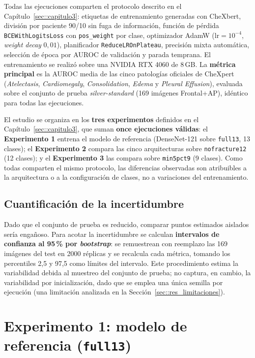 Todas las ejecuciones comparten el protocolo descrito en el
Capítulo~\ref{sec::capitulo3}: etiquetas de entrenamiento generadas con CheXbert,
división por paciente 90/10 sin fuga de información, función de pérdida
\texttt{BCEWithLogitsLoss} con \texttt{pos\_weight} por clase, optimizador AdamW
($\text{lr}=10^{-4}$, \textit{weight decay} $0{,}01$), planificador
\texttt{ReduceLROnPlateau}, precisión mixta automática, selección de época por AUROC
de validación y parada temprana. El entrenamiento se realizó sobre una NVIDIA RTX
4060 de 8\,GB. La \textbf{métrica principal} es la AUROC media de las cinco
patologías oficiales de CheXpert (\textit{Atelectasis}, \textit{Cardiomegaly},
\textit{Consolidation}, \textit{Edema} y \textit{Pleural Effusion}), evaluada sobre
el conjunto de prueba \textit{silver-standard} (169 imágenes Frontal+AP), idéntico
para todas las ejecuciones.

El estudio se organiza en los \textbf{tres experimentos} definidos en el
Capítulo~\ref{sec::capitulo3}, que suman \textbf{once ejecuciones válidas}: el
\textbf{Experimento 1} entrena el modelo de referencia (DenseNet-121 sobre
\texttt{full13}, 13 clases); el \textbf{Experimento 2} compara las cinco arquitecturas
sobre \texttt{nofracture12} (12 clases); y el \textbf{Experimento 3} las compara sobre
\texttt{min5pct9} (9 clases). Como todas comparten el mismo protocolo, las diferencias
observadas son atribuibles a la arquitectura o a la configuración de clases, no a
variaciones del entrenamiento.

\subsection{Cuantificación de la incertidumbre}

Dado que el conjunto de prueba es reducido, comparar puntos estimados aislados
sería engañoso. Para acotar la incertidumbre se calculan \textbf{intervalos de
confianza al 95\,\% por \textit{bootstrap}}: se remuestrean con reemplazo las 169
imágenes del test en 2000 réplicas y se recalcula cada métrica, tomando los
percentiles 2,5 y 97,5 como límites del intervalo. Este procedimiento estima la
variabilidad debida al muestreo del conjunto de prueba; no captura, en cambio, la
variabilidad por inicialización, dado que se emplea una única semilla por
ejecución (una limitación analizada en la Sección~\ref{sec::res_limitaciones}).


\section{Experimento 1: modelo de referencia (\texttt{full13})}
\label{sec::res_exp1}

